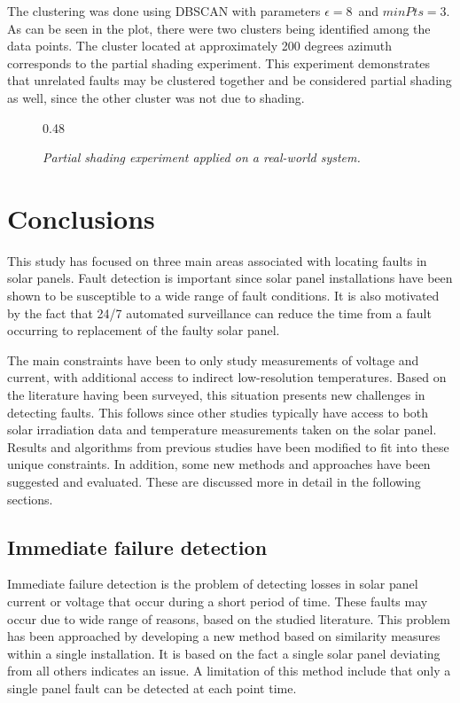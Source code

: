 The clustering was done using DBSCAN with parameters $\epsilon = 8$ and $minPts = 3$.
As can be seen in the plot, there were two clusters being identified among the data points.
The cluster located at approximately 200 degrees azimuth corresponds to the partial shading experiment.
This experiment demonstrates that unrelated faults may be clustered together and be considered partial shading as well, since the other cluster was not due to shading.

\begin{figure}[here]
\centering
{}
{0.48}
~
\caption[Partial shading experiment]{\emph{Partial shading experiment applied on a real-world system.}}
\end{figure}

\chapter{Conclusions}
This study has focused on three main areas associated with locating faults in solar panels.
Fault detection is important since solar panel installations have been shown to be susceptible to a wide range of fault conditions.
It is also motivated by the fact that 24/7 automated surveillance can reduce the time from a fault occurring to replacement of the faulty solar panel.

The main constraints have been to only study measurements of voltage and current, with additional access to indirect low-resolution temperatures.
Based on the literature having been surveyed, this situation presents new challenges in detecting faults.
This follows since other studies typically have access to both solar irradiation data and temperature measurements taken on the solar panel.
Results and algorithms from previous studies have been modified to fit into these unique constraints.
In addition, some new methods and approaches have been suggested and evaluated.
These are discussed more in detail in the following sections.

\section{Immediate failure detection}
Immediate failure detection is the problem of detecting losses in solar panel current or voltage that occur during a short period of time.
These faults may occur due to wide range of reasons, based on the studied literature.
This problem has been approached by developing a new method based on similarity measures within a single installation.
It is based on the fact a single solar panel deviating from all others indicates an issue.
A limitation of this method include that only a single panel fault can be detected at each point time.

